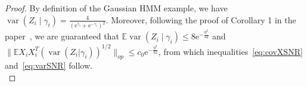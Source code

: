 \documentclass[twoside,11pt]{article}
\DeclareMathOperator{\var}{var}
\newcommand{\NORMAL}{\ensuremath{\mathcal{N}}}
\newcommand{\Indi}{\mathbf{1}}
\def\EE{ \mathbb{E} }
\def\E{ \mathrm{e} }							%
\newcommand{\norm}[1]{\ensuremath{\|#1\|_2}}
\newcommand{\paramobs}{\mu}
\newcommand{\trueparamobs}{\ensuremath{\paramobs^*}}
\newcommand{\paramobstilde}{\widetilde{\paramobs}}
\newcommand{\paramgamma}{\gamma}
\newcommand{\paramgammatilde}{\widetilde{\paramgamma}}
\newcommand{\elltwoballr}[2]{\ensuremath{\mathbb{B}_2\big(#1;#2\big)}}
\newcommand{\SNR}{\eta^2}
\newcommand{\canonvec}[1]{\mathrm{e}_1}
\newcommand{\defn}{: \, = }
\newcommand{\plaincon}{\ensuremath{c}}
\begin{document}
\begin{proof}
By definition of the Gaussian HMM example, we have $\var(Z_i \mid
\paramgamma_i) = \frac{4}{(\E^{\paramgamma_i} +
  \E^{-\paramgamma_i})^2}$.  Moreover, following the proof of
Corollary 1 in the paper~\cite{BalWaiYu14}, we are guaranteed that
$\EE \var(Z_i \mid \paramgamma_i) \leq 8
\E^{-\frac{\eta^2}{32}}$ and ${\|\EE X_iX_i^T (\var(Z_i|\paramgamma_i))^{1/2}\|_{op} \leq c_0\E^{-\frac{\SNR}{32}}}$, from which inequalities~\eqref{eq:covXSNR} and~\eqref{eq:varSNR}
follow.\\
%
%


\end{proof}
\end{document}
